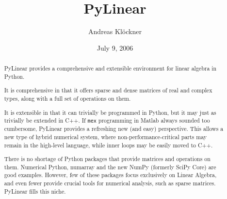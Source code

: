 \documentclass[hyperref]{manual}
\title{PyLinear}
\author{Andreas Kl\"ockner}
\date{July 9, 2006}
\begin{document}
\maketitle

\begin{abstract}
  \noindent
  PyLinear provides a comprehensive and extensible environment for 
  linear algebra in Python.

  It is comprehensive in that it offers sparse and dense matrices
  of real and complex types, along with a full set of operations
  on them.

  It is extensible in that it can trivially be programmed in Python, but it may
  just as trivially be extended in C++. If \texttt{mex} programming in Matlab
  always sounded too cumbersome, PyLinear provides a refreshing new (and easy)
  perspective. This allows a new type of hybrid numerical system, where
  non-performance-critical parts may remain in the high-level language, while
  inner loops may be easily moved to C++.

  There is no shortage of Python packages that provide matrices and operations
  on them. Numerical Python, numarray and the new NumPy (formerly SciPy Core)
  are good examples.  However, few of these packages focus exclusively on
  Linear Algebra, and even fewer provide crucial tools for numerical analysis,
  such as sparse matrices. PyLinear fills this niche.
\end{abstract}

\tableofcontents









\appendix




\end{document}
